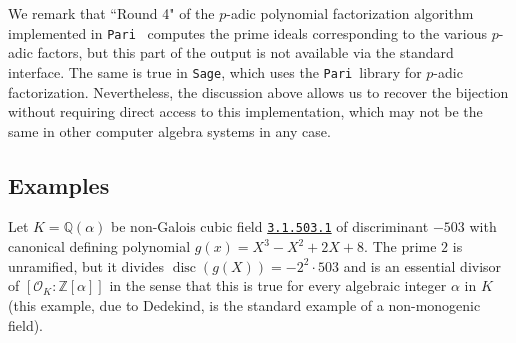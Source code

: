 \documentclass{article}
\def\Sage{{\tt Sage}}
\def\Pari{{\tt Pari}}
\def\Z{{\mathbb Z}}
\def\Q{{\mathbb Q}}
\def\OO{{\mathcal O}}
\def\p{{\mathfrak p}}
\def\Qpbar{\overline{\Q_p}}
\DeclareMathOperator{\disc}{disc}
\DeclareMathOperator{\ord}{ord}
\begin{document}
We remark that ``Round 4" of the $p$-adic polynomial factorization
algorithm implemented in \Pari\ \cite{Roblot} computes the prime
ideals corresponding to the various $p$-adic factors, but this part of
the output is not available via the standard interface.  The same is
true in \Sage, which uses the \Pari\ library for $p$-adic
factorization.  Nevertheless, the discussion above allows us to
recover the bijection without requiring direct access to this
implementation, which may not be the same in other computer algebra
systems in any case.

%
%
%

\subsection{Examples}
Let $K=\Q(\alpha)$ be non-Galois cubic field \href{www.lmfdb.org/NumberField/3.1.503.1}{\texttt{3.1.503.1}} of discriminant $-503$ with canonical defining polynomial $g(x)=X^3-X^2+2X+8$.
The prime $2$ is unramified, but it divides $\disc(g(X))=-2^2\cdot 503$ and is an essential divisor of $[\OO_K:\Z[\alpha]]$ in the sense that this is true for every algebraic integer $\alpha$ in $K$ (this example, due to Dedekind, is the standard example of a non-monogenic field).
\end{document}
